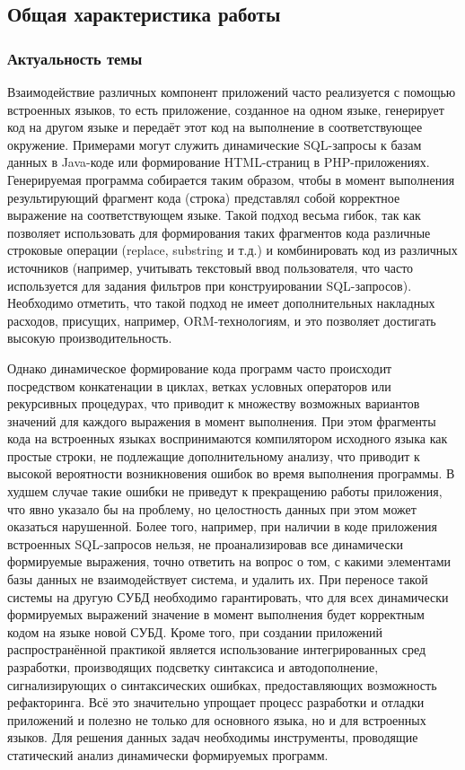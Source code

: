 \subsection*{\Large Общая характеристика работы}
\fontsize{14pt}{15pt}\selectfont
\subsubsection*{\large{Актуальность темы}}

Взаимодействие различных компонент приложений часто реализуется с помощью встроенных языков, то есть приложение, созданное на одном языке, генерирует код на другом языке и передаёт этот код на выполнение в соответствующее окружение. Примерами могут служить динамические SQL-запросы к базам данных в Java-коде или формирование HTML-страниц в PHP-приложениях. Генерируемая программа собирается таким образом, чтобы в момент выполнения результирующий фрагмент кода (строка) представлял собой корректное выражение на соответствующем языке. Такой подход весьма гибок, так как позволяет использовать для формирования таких фрагментов кода различные строковые операции (replace, substring и т.д.) и комбинировать код из различных источников (например, учитывать текстовый ввод пользователя, что часто используется для задания фильтров при конструировании SQL-запросов). Необходимо отметить, что такой подход не имеет дополнительных накладных расходов, присущих, например, ORM-технологиям, и это позволяет достигать высокую производительность. 

Однако динамическое формирование кода программ часто происходит посредством конкатенации в циклах, ветках условных операторов или рекурсивных процедурах, что приводит к множеству возможных вариантов значений для каждого выражения в момент выполнения. При этом фрагменты кода на встроенных языках воспринимаются компилятором исходного языка как простые строки, не подлежащие дополнительному анализу, что приводит к высокой вероятности возникновения ошибок во время выполнения программы. В худшем случае такие ошибки не приведут к прекращению работы приложения, что явно указало бы на проблему, но целостность данных при этом может оказаться нарушенной. Более того, например, при наличии в коде приложения встроенных SQL-запросов нельзя, не проанализировав все динамически формируемые выражения, точно ответить на вопрос о том, с какими элементами базы данных не взаимодействует система, и  удалить их. При переносе такой системы на другую СУБД необходимо гарантировать, что для всех динамически формируемых выражений значение в момент выполнения будет корректным кодом на языке новой СУБД. Кроме того, при создании приложений распространённой практикой является использование интегрированных сред разработки, производящих подсветку синтаксиса и автодополнение, сигнализирующих о синтаксических ошибках, предоставляющих возможность рефакторинга. Всё это значительно упрощает процесс разработки и отладки приложений и полезно не только для основного языка, но и для встроенных языков. Для решения данных задач необходимы инструменты, проводящие статический анализ динамически формируемых программ.  

